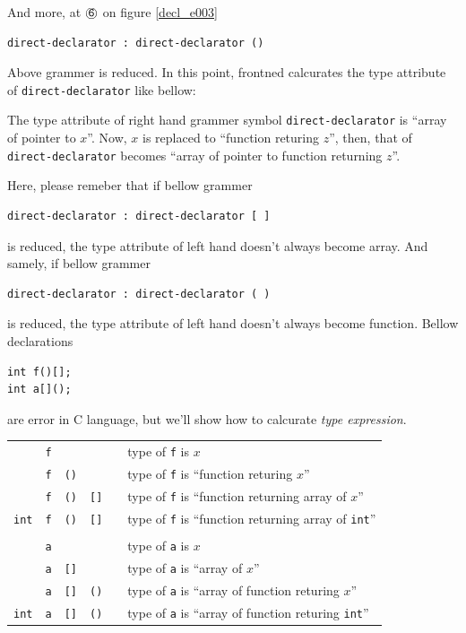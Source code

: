 And more, at ${\MARU{\tt 6}}$ on figure \ref{decl_e003}
\begin{verbatim}
direct-declarator : direct-declarator ()
\end{verbatim}
Above grammer is reduced. In this point, frontned calcurates
the type attribute of {\tt{direct-declarator}} like bellow:

The type attribute of right hand grammer symbol {\tt{direct-declarator}}
is ``array of pointer to $x$''.
Now, $x$ is replaced to ``function returing $z$'',
then, that of {\tt{direct-declarator}} becomes
``array of pointer to function returning $z$''.

Here, please remeber that if bellow grammer
\begin{verbatim}
direct-declarator : direct-declarator [ ]
\end{verbatim}
is reduced, the type attribute of left hand doesn't always become
array. And samely, if bellow grammer
\begin{verbatim}
direct-declarator : direct-declarator ( )
\end{verbatim}
is reduced, the type attribute of left hand doesn't always become
function.
Bellow declarations
\begin{verbatim}
int f()[];
int a[]();
\end{verbatim}
are error in C language, but we'll show how to calcurate
{\em type expression}. 

\begin{tabular}{cccccl}
           & {\tt{f}} &           &           &    &
                 type of {\tt{f}} is $x$                       \\
           & {\tt{f}} & {\tt{()}} &           &    &
                 type of {\tt{f}} is ``function returing $x$'' \\
           & {\tt{f}} & {\tt{()}} & {\tt{[]}} &    &
                 type of {\tt{f}} is ``function returning array of $x$'' \\
{\tt{int}} & {\tt{f}} & {\tt{()}} & {\tt{[]}} &    &
            type of {\tt{f}} is ``function returning array of {\tt{int}}'' \\
           &          &           &           &    &
                                                         \\
           & {\tt{a}} &           &           &    &
                 type of {\tt{a}} is $x$                       \\
           & {\tt{a}} & {\tt{[]}} &           &    &
                 type of {\tt{a}} is ``array of $x$'' \\
           & {\tt{a}} & {\tt{[]}} & {\tt{()}} &    &
            type of {\tt{a}} is ``array of function returing $x$'' \\
{\tt{int}} & {\tt{a}} & {\tt{[]}} & {\tt{()}} &    &
            type of {\tt{a}} is ``array of function returing {\tt{int}}'' \\
\end{tabular}

